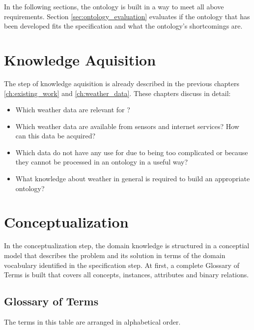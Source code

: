 \vspace{.5cm}

In the following sections, the \thinkhomeweather ontology is built in a way to meet all above requirements. Section \ref{sec:ontology_evaluation} evaluates if the ontology that has been developed fits the specification and what the ontology's shortcomings are.

\section{Knowledge Aquisition}

The step of knowledge aquisition is already described in the previous chapters \ref{ch:existing_work} and \ref{ch:weather_data}. These chapters discuss in detail:

\begin{itemize}
  \item Which weather data are relevant for \thinkhome?
  \item Which weather data are available from sensors and internet services? How can this data be acquired?
  \item Which data do not have any use for \thinkhomeweather due to being too complicated or because they cannot be processed in an ontology in a useful way?
  \item What knowledge about weather in general is required to build an appropriate ontology? %
\end{itemize}

\section{Conceptualization}

In the conceptualization step, the domain knowledge is structured in a conceptial model that describes the problem and its solution in terms of the domain vocabulary identified in the specification step. At first, a complete Glossary of Terms is built that covers all concepts, instances, attributes and binary relations.

\subsection{Glossary of Terms}

The terms in this table are arranged in alphabetical order.

